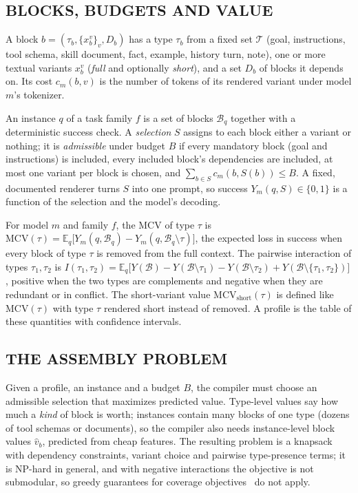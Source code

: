 
\subsection{BLOCKS, BUDGETS AND VALUE}
\begin{definition}\label{def:block}
A block $b=(\tau_b,\{x_b^v\}_v,D_b)$ has a type $\tau_b$ from a fixed set $\mathcal{T}$ (goal, instructions, tool schema,
skill document, fact, example, history turn, note), one or more textual variants $x_b^v$ (\emph{full} and optionally
\emph{short}), and a set $D_b$ of blocks it depends on. Its cost $c_m(b,v)$ is the number of tokens of its rendered variant
under model $m$'s tokenizer.
\end{definition}

An instance $q$ of a task family $f$ is a set of blocks $\mathcal{B}_q$ together with a deterministic success check. A
\emph{selection} $S$ assigns to each block either a variant or nothing; it is \emph{admissible} under budget $B$ if every
mandatory block (goal and instructions) is included, every included block's dependencies are included, at most one
variant per block is chosen, and $\sum_{b\in S} c_m(b,S(b))\le B$. A fixed, documented renderer turns $S$ into one prompt,
so success $Y_m(q,S)\in\{0,1\}$ is a function of the selection and the model's decoding.

\begin{definition}\label{def:mcv}
For model $m$ and family $f$, the MCV of type $\tau$ is
$\mathrm{MCV}(\tau)=\mathbb{E}_q\big[Y_m(q,\mathcal{B}_q)-Y_m(q,\mathcal{B}_q\setminus\tau)\big]$,
the expected loss in success when every block of type $\tau$ is removed from the full context. The pairwise interaction
of types $\tau_1,\tau_2$ is
$I(\tau_1,\tau_2)=\mathbb{E}_q\big[Y(\mathcal{B})-Y(\mathcal{B}\setminus\tau_1)-Y(\mathcal{B}\setminus\tau_2)+
Y(\mathcal{B}\setminus\{\tau_1,\tau_2\})\big]$,
positive when the two types are complements and negative when they are redundant or in conflict. The short-variant value
$\mathrm{MCV}_{\mathrm{short}}(\tau)$ is defined like $\mathrm{MCV}(\tau)$ with type $\tau$ rendered short instead of removed.
A profile is the table of these quantities with confidence intervals.
\end{definition}

\subsection{THE ASSEMBLY PROBLEM}
Given a profile, an instance and a budget $B$, the compiler must choose an admissible selection that maximizes predicted
value. Type-level values say how much a \emph{kind} of block is worth; instances contain many blocks of one type (dozens of
tool schemas or documents), so the compiler also needs instance-level block values $\hat v_b$, predicted from cheap
features. The resulting problem is a knapsack with dependency constraints, variant choice and pairwise type-presence
terms; it is NP-hard in general, and with negative interactions the objective is not submodular, so greedy guarantees for
coverage objectives~\cite{pacms2026,skillselect2026} do not apply.

